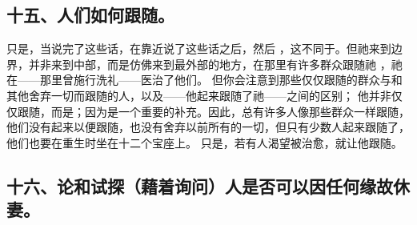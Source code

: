 
\subsection{十五、人们如何跟随。}

只是，当说完了这些话，在靠近说了这些话之后，然后 ，这不同于。但祂来到边界，并非来到中部，而是仿佛来到最外部的地方，在那里有许多群众跟随祂 ，祂在——那里曾施行洗礼——医治了他们。 但你会注意到那些仅仅跟随的群众与和其他舍弃一切而跟随的人，以及——他起来跟随了祂——之间的区别； 他并非仅仅跟随，而是；因为是一个重要的补充。因此，总有许多人像那些群众一样跟随，他们没有起来以便跟随，也没有舍弃以前所有的一切，但只有少数人起来跟随了，他们也要在重生时坐在十二个宝座上。 只是，若有人渴望被治愈，就让他跟随。\par


\subsection{十六、论和试探（藉着询问）人是否可以因任何缘故休妻。}

